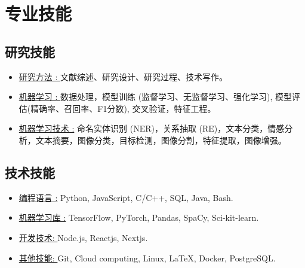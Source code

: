 
\section{\LARGE 专业技能}
\vspace{0.3cm}

\subsection{\textbf{\large 研究技能}}

\begin{itemize}[leftmargin=.3in]
\setlength\itemsep{.1em}
    \item \underline{研究方法 : } 文献综述、研究设计、研究过程、技术写作。

    \item \underline{机器学习 : } 数据处理，模型训练 (监督学习、无监督学习、强化学习), 模型评估(精确率、召回率、F1分数), 交叉验证，特征工程。
    
    \item \underline{机器学习技术 :} 命名实体识别 (NER)，关系抽取 (RE)，文本分类，情感分析，文本摘要，图像分类，目标检测，图像分割，特征提取，图像增强。
    


    
\end{itemize}
\vspace{3pt}

\subsection{\large 技术技能}

\begin{itemize}[leftmargin=.3in]
\setlength\itemsep{.1em}
    \item \underline{编程语言 :} Python, JavaScript, C/C++, SQL, Java, Bash.

    \item \underline{机器学习库 :} TensorFlow, PyTorch, Pandas, SpaCy, Sci-kit-learn.
    
    \item \underline{开发技术: } Node.js, Reactjs, Nextjs.
    
    \item \underline{其他技能: } Git, Cloud computing, Linux, \LaTeX, Docker, PostgreSQL.
\end{itemize}
